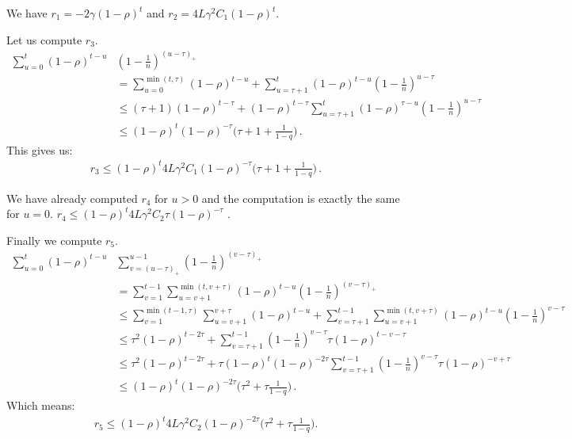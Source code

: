 \documentclass[twoside]{article}
\newcommand{\stepsize}{\gamma}
\newcommand{\overlap}{\tau}
\newcommand{\contraction}{\rho}
\newcommand{\lipschitz}{L}
\begin{document}
We have $r_1 = -2\stepsize (1 -\contraction)^t$ and $r_2=4\lipschitz\stepsize^2 C_1 (1 -\contraction)^t$.

Let us compute $r_3$.
\begin{align}
\sum_{u=0}^t (1 -\contraction)^{t -u} &(1 -\frac{1}{n})^{(u -\overlap)_+}
\nonumber \\
&= \sum_{u=0}^{\min(t, \overlap)} (1 -\contraction)^{t -u} 
	+ \sum_{u=\overlap +1}^t (1 -\contraction)^{t -u} (1 -\frac{1}{n})^{u -\overlap}	
\nonumber \\
&\leq (\overlap + 1) (1 -\contraction)^{t -\overlap} 
	+ (1 -\contraction)^{t -\overlap} \sum_{u=\overlap +1}^t (1 -\contraction)^{\overlap -u} (1 -\frac{1}{n})^{u -\overlap}	
\nonumber \\
&\leq (1 -\contraction)^t (1 -\contraction)^{-\overlap}
	\big(
		\overlap + 1 + \frac{1}{1 -q}
	\big)  \, .
\end{align}
This gives us:
\begin{align}
r_3 \leq (1 -\contraction)^t 4\lipschitz\stepsize^2 C_1 (1 -\contraction)^{-\overlap} \big(\overlap + 1 + \frac{1}{1 -q} \big)  \, .
\end{align}

We have already computed $r_4$ for $u>0$ and the computation is exactly the same for $u=0$. $r_4 \leq (1 - \contraction)^t 4\lipschitz\stepsize^2 C_2 \overlap(1-\contraction)^{-\overlap}$ .

Finally we compute $r_5$.
\begin{align}
\sum_{u=0}^t (1 -\contraction)^{t -u} &\sum_{v=(u -\overlap)_+}^{u -1} (1 -\frac{1}{n})^{(v -\overlap)_+}
\nonumber \\
&=\sum_{v=1}^{t -1} \sum_{u=v +1}^{\min(t, v +\overlap)} (1 -\contraction)^{t -u} (1 -\frac{1}{n})^{(v -\overlap)_+}
\nonumber \\
&\leq \sum_{v=1}^{\min(t-1, \overlap)} \sum_{u=v +1}^{v +\overlap} (1 -\contraction)^{t -u}
	+ \sum_{v=\overlap + 1}^{t -1} \sum_{u=v +1}^{\min(t, v +\overlap)} (1 -\contraction)^{t -u} (1 -\frac{1}{n})^{v -\overlap}
\nonumber \\
&\leq \overlap^2 (1 -\contraction)^{t -2\overlap}
	+ \sum_{v=\overlap +1}^{t -1} (1 -\frac{1}{n})^{v -\overlap} \overlap (1 -\contraction)^{t -v -\overlap} 
\nonumber \\
&\leq \overlap^2 (1 -\contraction)^{t -2\overlap}
	+ \overlap (1 -\contraction)^t (1 -\contraction)^{-2\overlap}\sum_{v=\overlap +1}^{t -1} (1 -\frac{1}{n})^{v -\overlap} \overlap (1 -\contraction)^{-v +\overlap} 
\nonumber  \\
&\leq (1 -\contraction)^t (1 -\contraction)^{-2\overlap}\big(\overlap^2 + \overlap \frac{1}{1 -q}\big)  \, .
\end{align}
Which means:
\begin{align}
r_5 \leq (1 -\contraction)^t 4\lipschitz\stepsize^2 C_2 (1 -\contraction)^{-2\overlap}\big(\overlap^2 + \overlap \frac{1}{1 -q}\big) .
\end{align}
\end{document}
